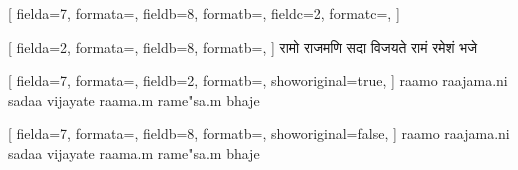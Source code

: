 \documentclass{article}
\begin{document}


\begin{multicols}{4}
[
fielda=7,
formata=\small,
fieldb=8,
formatb=\fipa,
fieldc=2,
formatc=\fdevb,
]
\end{multicols}







\newpage
{}[
fielda=2,
formata=\fdevb,
fieldb=8,
formatb=\fipa,
]{
रामो राजमणि सदा विजयते रामं रमेशं भजे
}

[
fielda=7,
formata=\fipa,
fieldb=2,
formatb=\fdevb,
showoriginal=true,
]{
raamo raajama.ni sadaa vijayate raama.m rame"sa.m bhaje
}

[
fielda=7,
formata=\fipa,
fieldb=8,
formatb=\fipa,
showoriginal=false,
]{
raamo raajama.ni sadaa vijayate raama.m rame"sa.m bhaje
}
\end{document}
